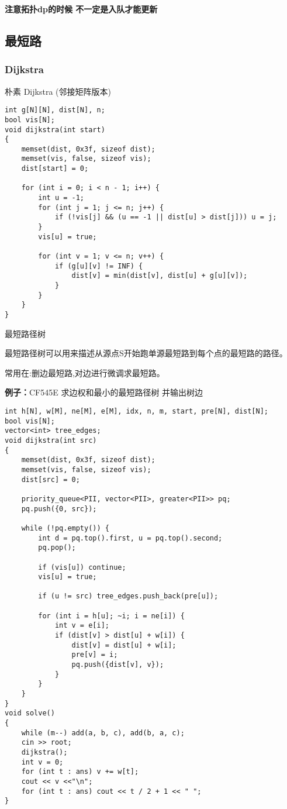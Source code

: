 \documentclass[a4paper, fontset=none]{ctexart}
\begin{document}
\textbf{注意拓扑dp的时候 不一定是入队才能更新}
\subsection{最短路}
\subsubsection{Dijkstra}
朴素 Dijkstra (邻接矩阵版本)
\begin{verbatim}
int g[N][N], dist[N], n;
bool vis[N];
void dijkstra(int start)
{
    memset(dist, 0x3f, sizeof dist);
    memset(vis, false, sizeof vis);
    dist[start] = 0;

    for (int i = 0; i < n - 1; i++) {
        int u = -1;
        for (int j = 1; j <= n; j++) {
            if (!vis[j] && (u == -1 || dist[u] > dist[j])) u = j;
        }
        vis[u] = true;

        for (int v = 1; v <= n; v++) {
            if (g[u][v] != INF) {
                dist[v] = min(dist[v], dist[u] + g[u][v]);
            }
        }
    }
}
\end{verbatim}

最短路径树

最短路径树可以用来描述从源点S开始跑单源最短路到每个点的最短路的路径。

常用在:删边最短路,对边进行微调求最短路。

\textbf{例子：}CF545E   求边权和最小的最短路径树 并输出树边

\begin{verbatim}
int h[N], w[M], ne[M], e[M], idx, n, m, start, pre[N], dist[N];
bool vis[N];
vector<int> tree_edges;
void dijkstra(int src)
{
    memset(dist, 0x3f, sizeof dist);
    memset(vis, false, sizeof vis);
    dist[src] = 0;

    priority_queue<PII, vector<PII>, greater<PII>> pq;
    pq.push({0, src});

    while (!pq.empty()) {
        int d = pq.top().first, u = pq.top().second;
        pq.pop();

        if (vis[u]) continue;
        vis[u] = true;

        if (u != src) tree_edges.push_back(pre[u]);

        for (int i = h[u]; ~i; i = ne[i]) {
            int v = e[i];
            if (dist[v] > dist[u] + w[i]) {
                dist[v] = dist[u] + w[i];
                pre[v] = i;
                pq.push({dist[v], v});
            }
        }
    }
}
void solve()
{
    while (m--) add(a, b, c), add(b, a, c);
    cin >> root;
    dijkstra();
    int v = 0;
    for (int t : ans) v += w[t];
    cout << v <<"\n";
    for (int t : ans) cout << t / 2 + 1 << " ";
}
\end{verbatim}
\end{document}
